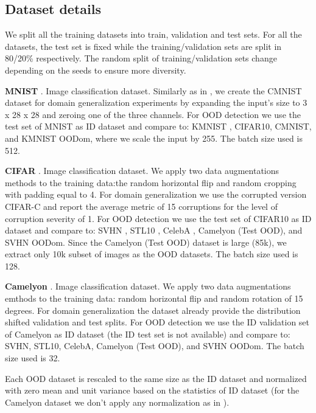 \subsection{Dataset details}
\label{appendix:dataset}
 We split all the training datasets into train, validation and test sets. For all the datasets, the test set is fixed while the training/validation sets are split in 80/20\% respectively. The random split of training/validation sets change depending on the seeds to ensure more diversity.  
 
\textbf{MNIST} \citep{lecun1998mnist}. Image classification dataset. Similarly as in \cite{arjovsky2019cmnist}, we create the CMNIST dataset for domain generalization experiments by expanding the input's size to 3 x 28 x 28 and zeroing one of the three channels. For OOD detection we use the test set of MNIST as ID dataset and compare to: KMNIST \citep{clanuwat2018kmnist}, CIFAR10, CMNIST, and KMNIST OODom, where we scale the input by 255. The batch size used is 512.

\textbf{CIFAR} \citep{krizhevsky09cifar}. Image classification dataset. We apply two data augmentations methods to the training data:the random horizontal flip and random cropping with padding equal to 4. For domain generalization we use the corrupted version CIFAR-C \citep{hendrycks2019corrupted} and report the average metric of 15 corruptions for the level of corruption severity of 1. For OOD detection we use the test set of CIFAR10 as ID dataset and compare to: SVHN \citep{netzer2011svhn}, STL10 \citep{coates2011stl10}, CelebA \citep{liu2015celeba}, Camelyon (Test OOD), and SVHN OODom. Since the Camelyon (Test OOD) dataset is large (85k), we extract only 10k subset of images as the OOD datasets. The batch size used is 128.

\textbf{Camelyon} \citep{koh2021wilds}. Image classification dataset. We apply two data augmentations emthods  to the training data: random horizontal flip and random rotation of 15 degrees. For domain generalization the dataset already provide the distribution shifted validation and test splits. For OOD detection we use the ID validation set of Camelyon as ID dataset (the ID  test set is not available) and compare to: SVHN, STL10, CelebA, Camelyon (Test OOD), and SVHN OODom. The batch size used is 32.

Each OOD dataset is rescaled to the same size as the ID dataset and normalized with zero mean and unit variance based on the statistics of ID dataset (for the Camelyon dataset we don't apply any normalization as in \cite{koh2021wilds}). 
